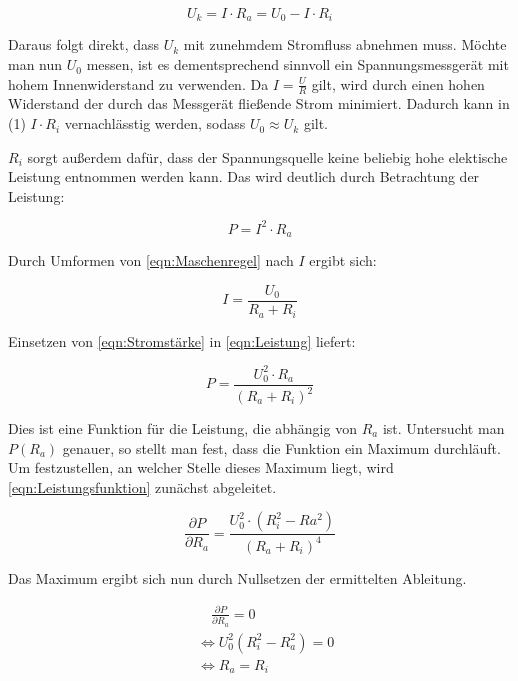 \begin{equation}
U_k = I\cdot R_a = U_0 - I\cdot R_i
\label{eqn:Maschenregel}
\end{equation}

Daraus folgt direkt, dass $U_k$ mit zunehmdem Stromfluss abnehmen muss. 
Möchte man nun $U_0$ messen, ist es dementsprechend sinnvoll ein Spannungsmessgerät
mit hohem Innenwiderstand zu verwenden. Da $I=\frac{U}{R}$ gilt, wird durch einen
hohen Widerstand der durch das Messgerät fließende Strom minimiert. Dadurch kann in 
(1) $I\cdot R_i$ vernachlässtig werden, sodass $U_0\approx U_k$ gilt.

$R_i$ sorgt außerdem dafür, dass der Spannungsquelle keine beliebig hohe
elektische Leistung entnommen werden kann. Das wird deutlich durch Betrachtung der
Leistung: 

\begin{equation}
P = I^2\cdot R_a
\label{eqn:Leistung}
\end{equation}

Durch Umformen von \eqref{eqn:Maschenregel} nach $I$ ergibt sich:

\begin{equation}
I = \frac{U_0}{R_a + R_i}
\label{eqn:Stromstärke}
\end{equation}

Einsetzen von \eqref{eqn:Stromstärke} in \eqref{eqn:Leistung} liefert:

\begin{equation}
P = \frac{U_0^2\cdot R_a}{(R_a + R_i)^2}
\label{eqn:Leistungsfunktion}
\end{equation}

Dies ist eine Funktion für die Leistung, die abhängig von $R_a$ ist. 
Untersucht man $P(R_a)$ genauer, so stellt man fest, dass die Funktion
ein Maximum durchläuft. Um festzustellen, an welcher Stelle dieses 
Maximum liegt, wird \eqref{eqn:Leistungsfunktion} zunächst abgeleitet.

\begin{equation}
\frac{\partial P}{\partial R_a} = \frac{U_0^2\cdot (R_i^2 - Ra^2)}{(R_a+R_i)^4}
\end{equation}

Das Maximum ergibt sich nun durch Nullsetzen der ermittelten Ableitung. 

\begin{align*}
&\quad \frac{\partial P}{\partial R_a} = 0 \\
&\Leftrightarrow U_0^2(R_i^2-R_a^2) = 0 \\
&\Leftrightarrow R_a = R_i 
\end{align*}


